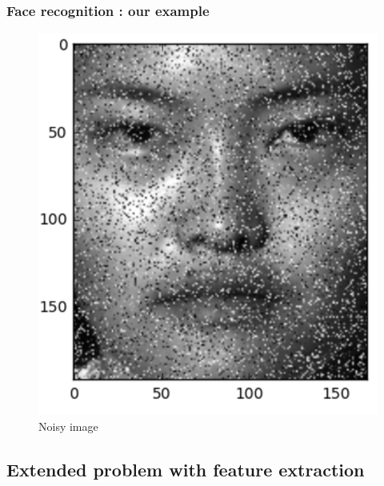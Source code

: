 \documentclass{beamer}
\begin{document}
\begin{frame}
\frametitle{Face recognition : our example}

			\begin{figure}[!ht]
			\begin{center}
			\includegraphics[scale=0.4]{noisy_face.png}
			\end{center}
			\caption{Noisy image}
			\label{fa}
			\end{figure}
\end{frame}


\subsection{Extended problem with feature extraction}
\end{document}
